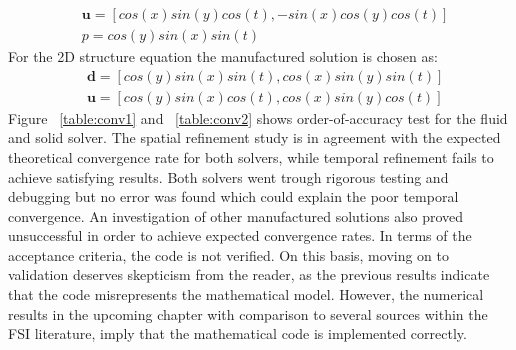 \begin{align*}
&\mathbf{u} = [cos(x)sin(y)cos(t), -sin(x)cos(y)cos(t)] \\
&p = cos(y)sin(x)sin(t)
\end{align*}
For the 2D structure equation the manufactured solution is chosen as:
\begin{align*}
&\mathbf{d} = [cos(y)sin(x)sin(t), cos(x)sin(y)sin(t)] \\
&\mathbf{u} = [cos(y)sin(x)cos(t), cos(x)sin(y)cos(t)]
\end{align*}
Figure ~\ref{table:conv1} and ~\ref{table:conv2} shows order-of-accuracy test for the fluid and solid solver. The spatial refinement study is in agreement with the expected theoretical convergence rate for both solvers, while temporal refinement fails to achieve satisfying results. Both solvers went trough rigorous testing and debugging but no error was found which could explain the poor temporal convergence. An investigation of other manufactured solutions also proved unsuccessful in order to achieve expected convergence rates. In terms of the acceptance criteria, the code is not verified. On this basis, moving on to validation deserves skepticism from the reader, as the previous results indicate that the code misrepresents the mathematical model. However, the numerical results in the upcoming chapter with comparison to several sources within the FSI literature, imply that the mathematical code is implemented correctly. 
